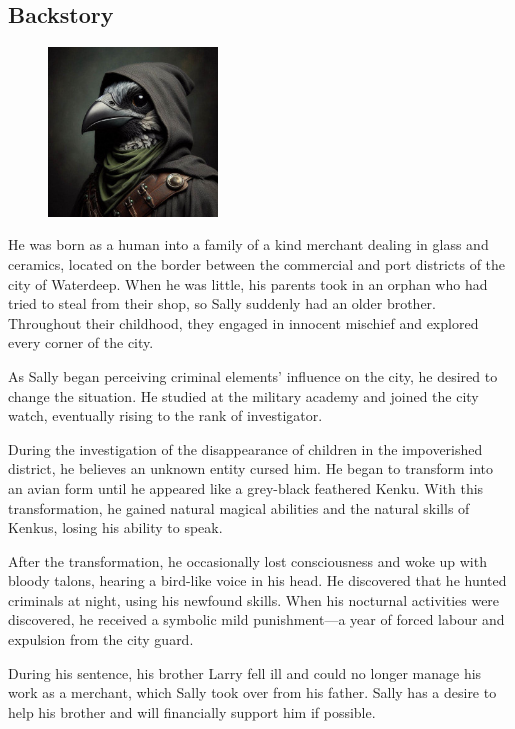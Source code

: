 \documentclass[10pt,onecolumn,twoside,openany,bg=full,layout=true]{dndbook}
\begin{document}
  \subsection{Backstory}\label{subsec:sally-backstory}
  \begin{figure}
    \begin{center}
      \includegraphics[width=0.4\textwidth]{img/characters/sally}
    \end{center}
  \end{figure}

He was born as a human into a family of a kind merchant dealing in glass and ceramics, located on the border between the
commercial and port districts of the city of Waterdeep.
When he was little, his parents took in an orphan who had tried to steal from their shop, so Sally suddenly had an
older brother.
Throughout their childhood, they engaged in innocent mischief and explored every corner of the city.

As Sally began perceiving criminal elements' influence on the city, he desired to change the situation.
He studied at the military academy and joined the city watch, eventually rising to the rank of investigator.

During the investigation of the disappearance of children in the impoverished district, he believes an unknown entity
cursed him.
He began to transform into an avian form until he appeared like a grey-black feathered Kenku.
With this transformation, he gained natural magical abilities and the natural skills of Kenkus, losing his ability
to speak.

After the transformation, he occasionally lost consciousness and woke up with bloody talons,
hearing a bird-like voice in his head.
He discovered that he hunted criminals at night, using his newfound skills.
When his nocturnal activities were discovered, he received a symbolic mild punishment—a year of forced labour and
expulsion from the city guard.

During his sentence, his brother Larry fell ill and could no longer manage his work as a merchant,
which Sally took over from his father.
Sally has a desire to help his brother and will financially support him if possible.
\end{document}
